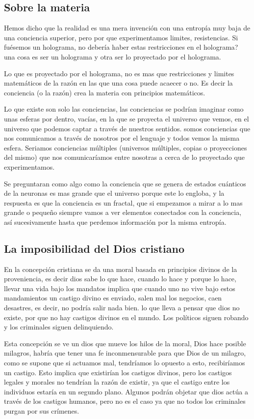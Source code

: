 \documentclass[12pt,letterpaper, a4paper ]{article}
\begin{document}
\subsection{Sobre la materia}
Hemos dicho que la realidad es una mera invención con una entropía muy baja de una conciencia superior, pero por que experimentamos limites, resistencias. Si fuésemos un holograma, no debería haber estas restricciones en el holograma? una cosa es ser un holograma y otra ser lo proyectado por el holograma.

Lo que es proyectado por el holograma, no es mas que restricciones y limites matemáticos de la razón en las que una cosa puede acaecer o no. Es decir la conciencia (o la razón) crea la materia con principios matemáticos.


Lo que existe son solo las conciencias, las conciencias se podrían imaginar como unas esferas por dentro, vacías, en la que se proyecta el universo que vemos, en el universo que podemos captar a través de nuestros sentidos. somos conciencias que nos comunicamos a través de nosotros por el lenguaje y todos vemos la misma esfera. Seriamos conciencias múltiples (universos múltiples, copias o proyecciones del mismo) que nos comunicaríamos entre nosotras a cerca de lo proyectado que experimentamos.

Se preguntaran como algo como la conciencia que se genera de estados cuánticos de la neuronas es mas grande que el universo porque este lo engloba, y la respuesta es que la conciencia es un fractal, que si empezamos a mirar a lo mas grande o pequeño siempre vamos a ver elementos conectados con la conciencia, así sucesivamente hasta que perdemos información por la misma entropía.

\subsection{La imposibilidad del Dios cristiano}

En la concepción cristiana se da una moral basada en principios divinos de la proveniencia, es decir dios sabe lo que hace, cuando lo hace y porque lo hace, llevar una vida bajo los mandatos implica que cuando uno no vive bajo estos mandamientos un castigo divino es enviado, salen mal los negocios, caen desastres, es decir, no podría salir nada bien. lo que lleva a pensar que dios no existe, por que no hay castigos divinos en el mundo. Los políticos siguen robando y los criminales siguen delinquiendo.

Esta concepción se ve un dios que mueve los hilos de la moral, Dios hace posible milagros, habría que tener una fe inconmensurable para que Dios de un milagro, como se supone que si actuamos mal, tendríamos lo opuesto a esto, recibiríamos un castigo. Esto implica que existirían los castigos divinos, pero los castigos legales y morales no tendrían la razón de existir, ya que el castigo entre los individuos estaría en un segundo plano. Algunos podrán objetar que dios actúa a través de los castigos humanos, pero no es el caso ya que no todos los criminales purgan por sus crímenes.
\end{document}
